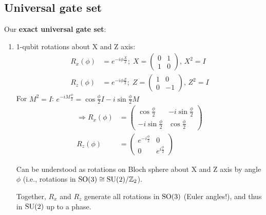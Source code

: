 \documentclass[a4paper, 12pt]{article}
\theoremstyle{plain}
\theoremstyle{definition}
\theoremstyle{remark}
\begin{document}
\subsection{Universal gate set}
Our \textbf{exact universal gate set}:
\begin{enumerate}[label=(\roman*)]
  \item 1-qubit rotations about X and Z axis:
    \begin{align*}
      R_x(\phi) &= e^{-i\phi \frac{X}{2}};\; X=
      \begin{pmatrix} 0 & 1 \\ 1 & 0
      \end{pmatrix},\, X^2=I \\
      R_z(\phi) &= e^{-i\phi \frac{Z}{2}};\; Z=
      \begin{pmatrix} 1 & 0 \\ 0 & -1
      \end{pmatrix},\, Z^2=I
    \end{align*}
    For $M^2=I$: $e^{-iM\frac{\phi}{2}}=\cos\frac{\phi}{2}I-i\sin\frac{\phi}{2}M$
    \begin{align*}
      \Longrightarrow R_x(\phi) &=
      \begin{pmatrix}
        \cos\frac{\phi}{2} & -i\sin\frac{\phi}{2} \\
        -i\sin\frac{\phi}{2} & \cos\frac{\phi}{2}
      \end{pmatrix}\\
      R_z(\phi) &=
      \begin{pmatrix}
        e^{-i\frac{\phi}{2}} & 0 \\
        0 & e^{i\frac{\phi}{2}}
      \end{pmatrix}
    \end{align*}

    Can be understood as rotations on Bloch sphere about X and Z axis by angle $\phi$ (i.e., rotations in $\textnormal{SO}(3)\cong \textnormal{SU}(2)/\mathbb{Z}_2$).

    Together, $R_x$ and $R_z$ generate all rotations in $\textnormal{SO}(3)$ (Euler angles!), and thus in $\textnormal{SU}(2)$ up to a phase.


\end{enumerate}
\end{document}
